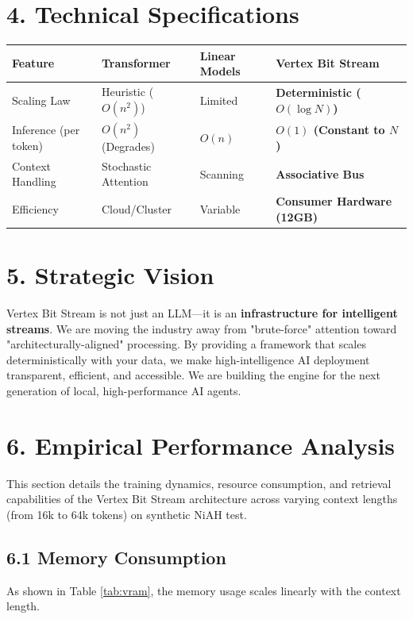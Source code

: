 \documentclass[a4paper,12pt]{article}
\begin{document}
\section*{4. Technical Specifications}
\begin{center}
\begin{tabular}{l l l l}
\toprule
\textbf{Feature} & \textbf{Transformer} & \textbf{Linear Models} & \textbf{Vertex Bit Stream} \\ \midrule
Scaling Law & Heuristic ($O(n^2)$) & Limited & \textbf{Deterministic ($O(\log N)$)} \\
Inference (per token) & $O(n^2)$ (Degrades) & $O(n)$ & \textbf{$O(1)$ (Constant to $N$)} \\
Context Handling & Stochastic Attention & Scanning & \textbf{Associative Bus} \\
Efficiency & Cloud/Cluster & Variable & \textbf{Consumer Hardware (12GB)} \\ \bottomrule
\end{tabular}
\end{center}

\section*{5. Strategic Vision}
Vertex Bit Stream is not just an LLM—it is an \textbf{infrastructure for intelligent streams}. We are moving the industry away from "brute-force" attention toward "architecturally-aligned" processing. By providing a framework that scales deterministically with your data, we make high-intelligence AI deployment transparent, efficient, and accessible. We are building the engine for the next generation of local, high-performance AI agents.

\newpage

\section*{6. Empirical Performance Analysis}
This section details the training dynamics, resource consumption, and retrieval capabilities of the Vertex Bit Stream architecture across varying context lengths (from 16k to 64k tokens) on synthetic NiAH test.

\subsection*{6.1 Memory Consumption}
As shown in Table \ref{tab:vram}, the memory usage scales linearly with the context length.
\end{document}
